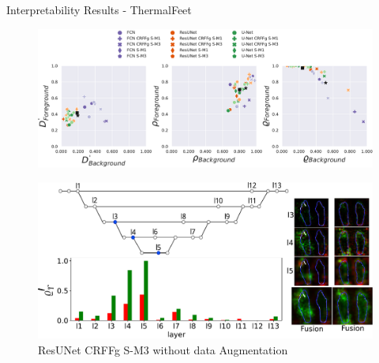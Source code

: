 \documentclass[aspectratio=169]{beamer}
\begin{document}
\begin{frame}[allowframebreaks]{Interpretability Results - ThermalFeet}

\begin{figure}
    \centering
    \includegraphics[width=1\linewidth]{Figures/interpretability_results_infrared_thermal_feet_both1.pdf}
\end{figure}
\framebreak
\begin{figure}
    \centering
    \includegraphics[width=0.79\linewidth]{Figures/resunet_best.pdf}
    \caption{ResUNet CRFFg S-M3 without data Augmentation}
\end{figure}

\end{frame}
\end{document}
